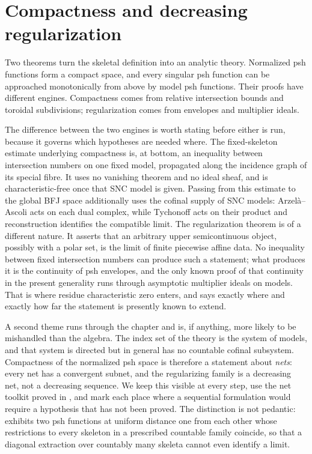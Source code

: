 \chapter{Compactness and decreasing regularization}
\label{chap:bfj-compactness}

Two theorems turn the skeletal definition into an analytic theory.
Normalized psh functions form a compact space, and every singular psh
function can be approached monotonically from above by model psh functions.
Their proofs have different engines.  Compactness comes from relative
intersection bounds and toroidal subdivisions; regularization comes from
envelopes and multiplier ideals.

The difference between the two engines is worth stating before either is
run, because it governs which hypotheses are needed where.  The
fixed-skeleton estimate underlying compactness is, at bottom, an inequality
between intersection numbers on one fixed model, propagated along the
incidence graph of its special fibre.  It uses no vanishing theorem and no
ideal sheaf, and is characteristic-free once that SNC model is given.
Passing from this estimate to the global BFJ space additionally uses the
cofinal supply of SNC models: Arzel\`a--Ascoli acts on each dual complex,
while Tychonoff acts on their product and reconstruction identifies the
compatible limit.  The regularization theorem is of a different nature.
It asserts that an arbitrary upper semicontinuous
object, possibly with a polar set, is the limit of finite piecewise affine
data.  No inequality between fixed intersection numbers can produce such a
statement; what produces it is the continuity of psh envelopes, and the only
known proof of that continuity in the present generality runs through
asymptotic multiplier ideals on models.  That is where residue
characteristic zero enters, and  says exactly
where and exactly how far the statement is presently known to extend.

A second theme runs through the chapter and is, if anything, more likely to
be mishandled than the algebra.  The index set of the theory is the system
of models, and that system is directed but in general has no countable
cofinal subsystem.  Compactness of the normalized psh space is therefore a
statement about \emph{nets}: every net has a convergent subnet, and the
regularizing family is a decreasing net, not a decreasing sequence.  We keep
this visible at every step, use the net toolkit proved in
, and mark each place where a sequential
formulation would require a hypothesis that has not been proved.  The
distinction is not pedantic:  exhibits two
psh functions at uniform distance one from each other whose restrictions to
every skeleton in a prescribed countable family coincide, so that a diagonal
extraction over countably many skeleta cannot even identify a limit.

